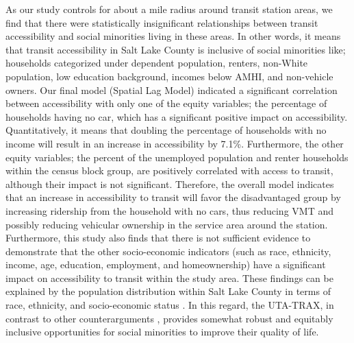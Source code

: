 \documentclass[numbered]{trbunofficial}
\begin{document}
As our study controls for about a mile radius around transit station areas, we find that there were statistically insignificant relationships between transit accessibility and social minorities living in these areas. In other words, it means that transit accessibility in Salt Lake County is inclusive of social minorities like; households categorized under dependent population, renters, non-White population, low education background, incomes below AMHI, and non-vehicle owners. Our final model (Spatial Lag Model) indicated a significant correlation between accessibility with only one of the equity variables; the percentage of households having no car, which has a significant positive impact on accessibility. Quantitatively, it means that doubling the percentage of households with no income will result in an increase in accessibility by 7.1\%. Furthermore, the other equity variables; the percent of the unemployed population and renter households within the census block group, are positively correlated with access to transit, although their impact is not significant. Therefore, the overall model indicates that an increase in accessibility to transit will favor the disadvantaged group by increasing ridership from the household with no cars, thus reducing VMT and possibly reducing vehicular ownership in the service area around the station. Furthermore, this study also finds that there is not sufficient evidence to demonstrate that the other socio-economic indicators (such as race, ethnicity, income, age, education, employment, and homeownership) have a significant impact on accessibility to transit within the study area. These findings can be explained by the population distribution within Salt Lake County in terms of race, ethnicity, and socio-economic status \cite{UtahTransitAuthority2021}. In this regard, the UTA-TRAX, in contrast to other counterarguments \cite{McKane2020,Padeiro2019,Ewing2017}, provides somewhat robust and equitably inclusive opportunities for social minorities to improve their quality of life.
\end{document}
